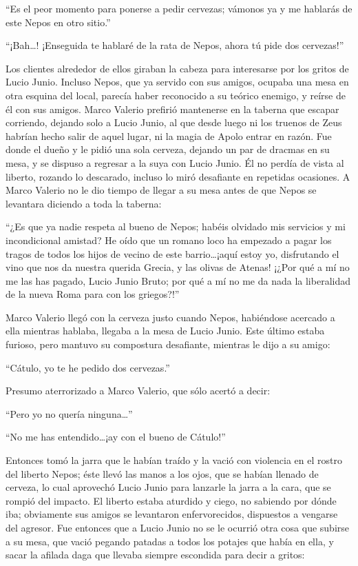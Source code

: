 \documentclass[11pt,openany]{book}
\begin{document}
“Es el peor momento para ponerse a pedir cervezas; vámonos ya y me hablarás de este Nepos en otro sitio.” 

“¡Bah\dots! ¡Enseguida te hablaré de la rata de Nepos, ahora tú pide dos cervezas!” 

Los clientes alrededor de ellos giraban la cabeza para interesarse por los gritos de Lucio Junio. Incluso Nepos, que ya servido con sus amigos, ocupaba una mesa en otra esquina del local, parecía haber reconocido a su teórico enemigo, y reírse de él con sus amigos. Marco Valerio prefirió mantenerse en la taberna que escapar corriendo, dejando solo a Lucio Junio, al que desde luego ni los truenos de Zeus habrían hecho salir de aquel lugar, ni la magia de Apolo entrar en razón. Fue donde el dueño y le pidió una sola cerveza, dejando un par de dracmas en su mesa, y se dispuso a regresar a la suya con Lucio Junio. Él no perdía de vista al liberto, rozando lo descarado, incluso lo miró desafiante en repetidas ocasiones. A Marco Valerio no le dio tiempo de llegar a su mesa antes de que Nepos se levantara diciendo a toda la taberna: 

“¿Es que ya nadie respeta al bueno de Nepos; habéis olvidado mis servicios y mi incondicional amistad? He oído que un romano loco ha empezado a pagar los tragos de todos los hijos de vecino de este barrio\dots ¡aquí estoy yo, disfrutando el vino que nos da nuestra querida Grecia, y las olivas de Atenas! ¡¿Por qué a mí no me las has pagado, Lucio Junio Bruto; por qué a mí no me da nada la liberalidad de la nueva Roma para con los griegos?!” 

Marco Valerio llegó con la cerveza justo cuando Nepos, habiéndose acercado a ella mientras hablaba, llegaba a la mesa de Lucio Junio. Este último estaba furioso, pero mantuvo su compostura desafiante, mientras le dijo a su amigo: 

“Cátulo, yo te he pedido dos cervezas.” 

Presumo aterrorizado a Marco Valerio, que sólo acertó a decir: 

“Pero yo no quería ninguna\dots” 

“No me has entendido\dots ¡ay con el bueno de Cátulo!” 

Entonces tomó la jarra que le habían traído y la vació con violencia en el rostro del liberto Nepos; éste llevó las manos a los ojos, que se habían llenado de cerveza, lo cual aprovechó Lucio Junio para lanzarle la jarra a la cara, que se rompió del impacto. El liberto estaba aturdido y ciego, no sabiendo por dónde iba; obviamente sus amigos se levantaron enfervorecidos, dispuestos a vengarse del agresor. Fue entonces que a Lucio Junio no se le ocurrió otra cosa que subirse a su mesa, que vació pegando patadas a todos los potajes que había en ella, y sacar la afilada daga que llevaba siempre escondida para decir a gritos: 
\end{document}
